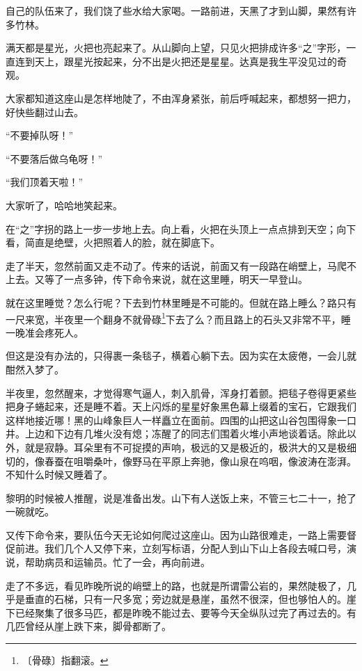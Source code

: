 \documentclass[12pt,UTF-8,openany]{ctexbook}
\begin{document}
\begin{large}
    自己的队伍来了，我们饶了些水给大家喝。一路前进，天黑了才到山脚，果然有许多竹林。
    
    满天都是星光，火把也亮起来了。从山脚向上望，只见火把排成许多“之”字形，一直连到天上，跟星光按起来，分不出是火把还是星星。达真是我生平没见过的奇观。
    
    大家都知道这座山是怎样地陡了，不由浑身紧张，前后呼喊起来，都想努一把力，好快些翻过山去。
    
    “不要掉队呀！”
    
    “不要落后做乌龟呀！”
    
    “我们顶着天啦！”
    
    大家听了，哈哈地笑起来。
    
    在“之”字拐的路上一步一步地上去。向上看，火把在头顶上一点点排到天空；向下看，简直是绝壁，火把照着人的脸，就在脚底下。
    
    走了半天，忽然前面又走不动了。传来的话说，前面又有一段路在峭壁上，马爬不上去。又等了一点多钟，传下命令来说，就在这里睡，明天一早登山。
    
    就在这里睡觉？怎么行呢？下去到竹林里睡是不可能的。但就在路上睡么？路只有一尺来宽，半夜里一个翻身不就骨碌\footnote{〔骨碌〕指翻滚。}下去了么？而且路上的石头又非常不平，睡一晚准会疼死人。
    
    但这是没有办法的，只得裹一条毯子，横着心躺下去。因为实在太疲倦，一会儿就酣然入梦了。
    
    半夜里，忽然醒来，才觉得寒气逼人，刺入肌骨，浑身打着颤。把毯子卷得更紧些把身子蜷起来，还是睡不着。天上闪烁的星星好象黑色幕上缀着的宝石，它跟我们这样地接近哪！黑的山峰象巨人一样矗立在面前。四围的山把这山谷包围得象一口井。上边和下边有几堆火没有熄；冻醒了的同志们围着火堆小声地谈着话。除此以外，就是寂静。耳朵里有不可捉摸的声响，极远的又是极近的，极洪大的又是极细切的，像春蚕在咀嚼桑叶，像野马在平原上奔驰，像山泉在呜咽，像波涛在澎湃。不知什么时候又睡着了。
    
    黎明的时候被人推醒，说是准备出发。山下有人送饭上来，不管三七二十一，抢了一碗就吃。
    
    又传下命令来，要队伍今天无论如何爬过这座山。因为山路很难走，一路上需要督促前进。我们几个人又停下来，立刻写标语，分配人到山下山上各段去喊口号，演说，帮助病员和运输员。忙了一会，再向前进。
    
    走了不多远，看见昨晚所说的峭壁上的路，也就是所谓雷公岩的，果然陡极了，几乎是垂直的石梯，只有一尺多宽；旁边就是悬崖，虽然不很深，但也够怕人的。崖下已经聚集了很多马匹，都是昨晚不能过去、要等今天全纵队过完了再过去的。有几匹曾经从崖上跌下来，脚骨都断了。
    

\end{large}
\end{document}
